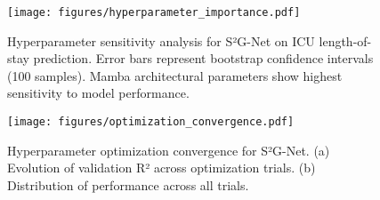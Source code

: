
\begin{figure}[t!]
\centering
\texttt{[image: figures/hyperparameter\_importance.pdf]}
\caption{Hyperparameter sensitivity analysis for S²G-Net on ICU length-of-stay prediction. 
Error bars represent bootstrap confidence intervals (100 samples). 
Mamba architectural parameters show highest sensitivity to model performance.}
\label{fig:hyperparam_importance}
\end{figure}

\begin{figure}[t!]
\centering
\texttt{[image: figures/optimization\_convergence.pdf]}
\caption{Hyperparameter optimization convergence for S²G-Net. 
(a) Evolution of validation R² across optimization trials. 
(b) Distribution of performance across all trials.}
\label{fig:optimization_convergence}
\end{figure}
